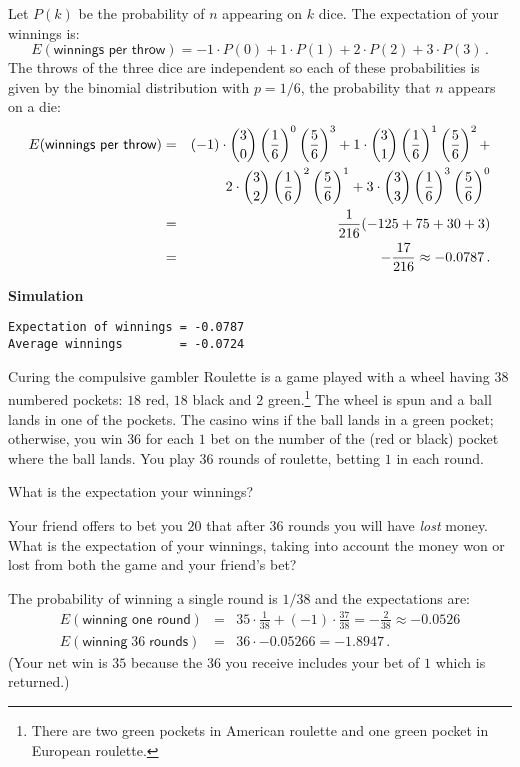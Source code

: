 \solution{}

Let $P(k)$ be the probability of $n$ appearing on $k$ dice. The expectation of your winnings is:
\[
E(\textsf{winnings per throw})=-1\cdot P(0) + 1\cdot P(1) + 2\cdot P(2) + 3\cdot P(3)\,.
\]
The throws of the three dice are independent so each of these probabilities is given by the binomial distribution with $p=1/6$, the probability that $n$ appears on a die:
\begin{eqnarray*}
E(\textsf{winnings per throw}) &=& 
(-1)\cdot \displaystyle{3 \choose 0}\left(\frac{1}{6}\right)^0\left(\frac{5}{6}\right)^3
+1\cdot\displaystyle{3 \choose 1}\left(\frac{1}{6}\right)^1\left(\frac{5}{6}\right)^2+\\
&&2\cdot{3\choose 2}\left(\frac{1}{6}\right)^2\left(\frac{5}{6}\right)^1+
3\cdot\displaystyle{3 \choose 3}\left(\frac{1}{6}\right)^3\left(\frac{5}{6}\right)^0\\
&=& \frac{1}{216}(-125+75+30+3)\\
&=&-\frac{17}{216}\approx -0.0787\,.
\end{eqnarray*}

\textbf{Simulation}
\begin{verbatim}
Expectation of winnings = -0.0787
Average winnings        = -0.0724
\end{verbatim}


\begin{prob}{Curing the compulsive gambler}
Roulette is a game played with a wheel having $38$ numbered pockets: $18$ red, $18$ black and $2$ green.\footnote{There are two green pockets in American roulette and one green pocket in European roulette.} The wheel is spun and a ball lands in one of the pockets. The casino wins if the ball lands in a green pocket; otherwise, you win $36$ for each $1$ bet on the number of the (red or black) pocket where the ball lands. You play $36$ rounds of roulette,  betting $1$ in each round.

 What is the expectation your winnings?

 Your friend offers to bet you $20$ that after $36$ rounds you will have \emph{lost} money. What is the expectation of your winnings, taking into account the money won or lost from both the game and your friend's bet?
\end{prob}

\solution{}

 The probability of winning a single round is $1/38$ and the expectations are:
\begin{eqnarray*}
E(\textsf{winning one round})&=&35\cdot \frac{1}{38} + (-1)\cdot\frac{37}{38} = -\frac{2}{38} \approx -0.0526\\
E(\textsf{winning}\;36\;\textsf{rounds})&=&36\cdot -0.05266=-1.8947\,.
\end{eqnarray*}
(Your net win is $35$ because the $36$ you receive includes your bet of $1$ which is returned.)

